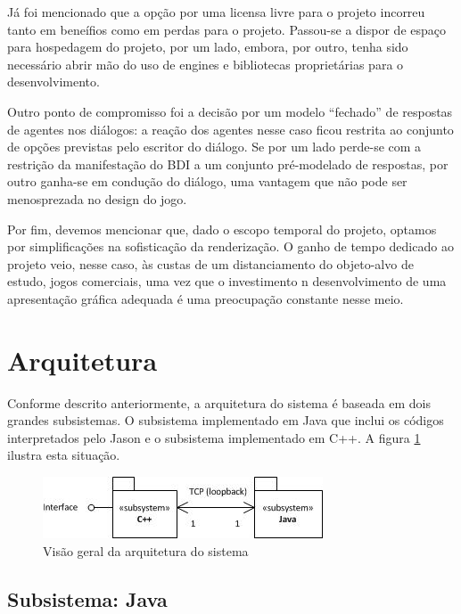 Já foi mencionado que a opção por uma licensa livre para o projeto incorreu tanto em beneífios como em perdas para o projeto. Passou-se a dispor de espaço para hospedagem do projeto, por um lado, embora, por outro, tenha sido necessário abrir mão do uso de engines e bibliotecas proprietárias para o desenvolvimento.

Outro ponto de compromisso foi a decisão por um modelo ``fechado'' de respostas de agentes nos diálogos: a reação dos agentes nesse caso ficou restrita ao conjunto de opções previstas pelo escritor do diálogo. Se por um lado perde-se com a restrição da manifestação do BDI a um conjunto pré-modelado de respostas, por outro ganha-se em condução do diálogo, uma vantagem que não pode ser menosprezada no design do jogo.

Por fim, devemos mencionar que, dado o escopo temporal do projeto, optamos por simplificações na sofisticação da renderização. O ganho de tempo dedicado ao projeto veio, nesse caso, às custas de um distanciamento do objeto-alvo de estudo, jogos comerciais, uma vez que o investimento n desenvolvimento de uma apresentação gráfica adequada é uma preocupação constante nesse meio.

\section{Arquitetura}

Conforme descrito anteriormente, a arquitetura do sistema é baseada em dois grandes subsistemas. O subsistema implementado em Java que inclui os códigos interpretados pelo Jason e o subsistema implementado em C++. A figura \ref{arquiteturaGeral} ilustra esta situação.

\begin{figure}
\centering
\includegraphics {figuras/arquitetura.jpg}
\caption{Visão geral da arquitetura do sistema}
\label{arquiteturaGeral}
\end{figure}


\subsection{Subsistema: Java}

